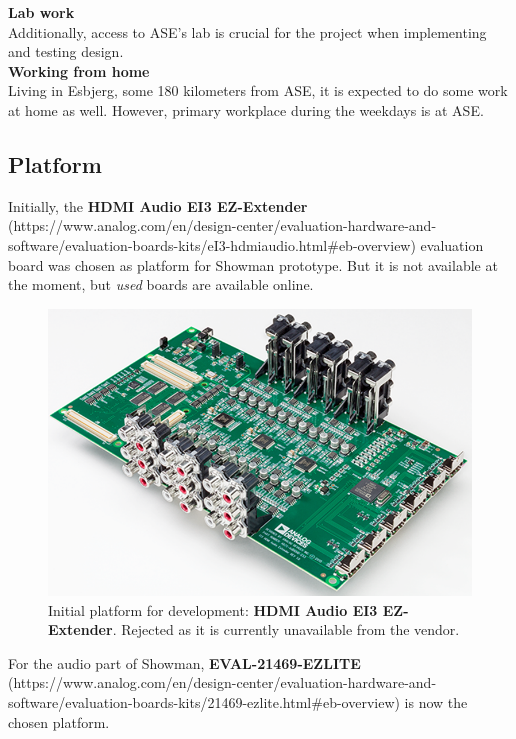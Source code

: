 \textbf{Lab work} \\
Additionally, access to ASE's lab is crucial for the project when implementing and testing design. \\

\textbf{Working from home} \\
Living in Esbjerg, some 180 kilometers from ASE, it is expected to do some work at home as well. However, primary workplace during the weekdays is at ASE. \\

\subsection{Platform}
Initially, the \textbf{HDMI Audio EI3 EZ-Extender} (https://www.analog.com/en/design-center/evaluation-hardware-and-software/evaluation-boards-kits/eI3-hdmiaudio.html\#eb-overview) evaluation board was chosen as platform for Showman prototype. But it is not available at the moment, but \textit{used} boards are available online. \\

\begin{figure}[H]
\centering
\includegraphics[scale=1]{./pictures/ei3.png}
\caption{Initial platform for development: \textbf{HDMI Audio EI3 EZ-Extender}. Rejected as it is currently unavailable from the vendor.}
\label{fig:ei3.png}
\end{figure}

For the audio part of Showman, \textbf{EVAL-21469-EZLITE} (https://www.analog.com/en/design-center/evaluation-hardware-and-software/evaluation-boards-kits/21469-ezlite.html\#eb-overview) is now the chosen platform. \\

